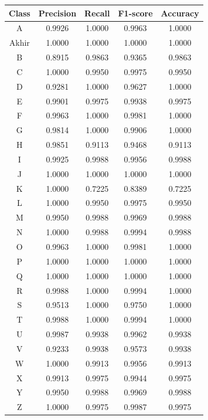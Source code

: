 \begin{table}[!hbt]
	\centering
	\label{tbl:TabelModelCNN}
	\begin{tabular}{|c|c|c|c|c|}
	\hline
	Class & Precision & Recall & F1-score & Accuracy \\
	\hline
	A & 0.9926 & 1.0000 & 0.9963 & 1.0000 \\
	Akhir & 1.0000 & 1.0000 & 1.0000 & 1.0000 \\
	B & 0.8915 & 0.9863 & 0.9365 & 0.9863 \\
	C & 1.0000 & 0.9950 & 0.9975 & 0.9950 \\
	D & 0.9281 & 1.0000 & 0.9627 & 1.0000 \\
	E & 0.9901 & 0.9975 & 0.9938 & 0.9975 \\
	F & 0.9963 & 1.0000 & 0.9981 & 1.0000 \\
	G & 0.9814 & 1.0000 & 0.9906 & 1.0000 \\
	H & 0.9851 & 0.9113 & 0.9468 & 0.9113 \\
	I & 0.9925 & 0.9988 & 0.9956 & 0.9988 \\
	J & 1.0000 & 1.0000 & 1.0000 & 1.0000 \\
	K & 1.0000 & 0.7225 & 0.8389 & 0.7225 \\
	L & 1.0000 & 0.9950 & 0.9975 & 0.9950 \\
	M & 0.9950 & 0.9988 & 0.9969 & 0.9988 \\
	N & 1.0000 & 0.9988 & 0.9994 & 0.9988 \\
	O & 0.9963 & 1.0000 & 0.9981 & 1.0000 \\
	P & 1.0000 & 1.0000 & 1.0000 & 1.0000 \\
	Q & 1.0000 & 1.0000 & 1.0000 & 1.0000 \\
	R & 0.9988 & 1.0000 & 0.9994 & 1.0000 \\
	S & 0.9513 & 1.0000 & 0.9750 & 1.0000 \\
	T & 0.9988 & 1.0000 & 0.9994 & 1.0000 \\
	U & 0.9987 & 0.9938 & 0.9962 & 0.9938 \\
	V & 0.9233 & 0.9938 & 0.9573 & 0.9938 \\
	W & 1.0000 & 0.9913 & 0.9956 & 0.9913 \\
	X & 0.9913 & 0.9975 & 0.9944 & 0.9975 \\
	Y & 0.9950 & 0.9988 & 0.9969 & 0.9988 \\
	Z & 1.0000 & 0.9975 & 0.9987 & 0.9975 \\
	\hline
	\end{tabular}
\end{table}

